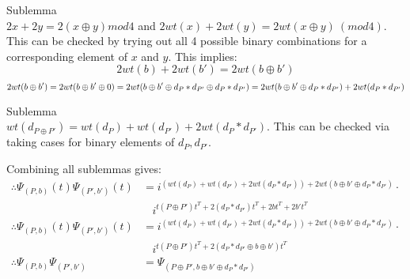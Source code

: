 \documentclass[12pt]{article}
\begin{document}
{Sublemma\\
$2x + 2y = 2(x \oplus y) mod 4$ and $2wt(x) + 2wt(y) = 2wt(x \oplus y)\ (mod 4)$. This can be checked by trying out all 4 possible binary combinations for a corresponding element of $x$ and $y$. This implies: 
\[ 2wt(b) + 2wt(b') = 2wt(b \oplus b') \]
\[ 2wt(b \oplus b') = 2wt(b \oplus b' \oplus 0) = 2wt(b \oplus b' \oplus d_P * d_{P'} \oplus d_P * d_{P'})\\= 2wt(b \oplus b' \oplus d_P * d_{P'}) + 2wt(d_P * d_{P'}) \]

Sublemma\\
$wt(d_{P \oplus P'}) = wt(d_P) + wt(d_{P'}) + 2wt(d_P * d_{P'})$. This can be checked via taking cases for binary elements of $d_P, d_{P'}$.


Combining all sublemmas gives:
\begin{align*}
    \therefore \Psi_{(P, b)}(t)\Psi_{(P', b')}(t) &= i^{(wt(d_P) + wt(d_{P'}) + 2wt(d_P * d_{P'})) + 2wt(b \oplus b' \oplus d_P * d_{P'})}\cdot\\
    &\ \ \ \ i^{t(P \oplus P')t^T + 2(d_P * d_{P'})t^T + 2bt^T + 2b't^T}\\
    \therefore \Psi_{(P, b)}(t)\Psi_{(P', b')}(t) &= i^{(wt(d_P) + wt(d_{P'}) + 2wt(d_P * d_{P'})) + 2wt(b \oplus b' \oplus d_P * d_{P'})}\cdot\\
    &\ \ \ \ i^{t(P \oplus P')t^T + 2(d_P * d_{P'} \oplus b \oplus b')t^T}\\
    \therefore \Psi_{(P, b)}\Psi_{(P', b')} &= \Psi_{(P \oplus P', b \oplus b' \oplus d_P * d_{P'})}
\end{align*}

}
\end{document}
